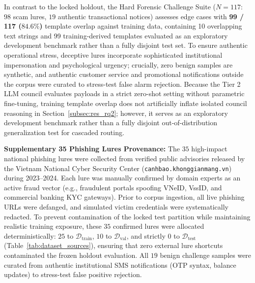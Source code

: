 In contrast to the locked holdout, the Hard Forensic Challenge Suite ($N=117$: $98$ scam lures, $19$ authentic transactional notices) assesses edge cases with \textbf{99 / 117 ($84.6\%$)} template overlap against training data, containing 10 overlapping text strings and 99 training-derived templates evaluated as an exploratory development benchmark rather than a fully disjoint test set. To ensure authentic operational stress, deceptive lures incorporate sophisticated institutional impersonation and psychological urgency; crucially, zero benign samples are synthetic, and authentic customer service and promotional notifications outside the corpus were curated to stress-test false alarm rejection. Because the Tier 2 LLM council evaluates payloads in a strict zero-shot setting without parametric fine-tuning, training template overlap does not artificially inflate isolated council reasoning in Section~\ref{subsec:res_rq2}; however, it serves as an exploratory development benchmark rather than a fully disjoint out-of-distribution generalization test for cascaded routing.

\textbf{Supplementary 35 Phishing Lures Provenance:} The $35$ high-impact national phishing lures were collected from verified public advisories released by the Vietnam National Cyber Security Center (\texttt{canhbao.khonggianmang.vn}) during 2023--2024. Each lure was manually confirmed by domain experts as an active fraud vector (e.g., fraudulent portals spoofing VNeID, VssID, and commercial banking KYC gateways). Prior to corpus ingestion, all live phishing URLs were defanged, and simulated victim credentials were systematically redacted. To prevent contamination of the locked test partition while maintaining realistic training exposure, these $35$ confirmed lures were allocated deterministically: $25$ to $\mathcal{D}_{\text{train}}$, $10$ to $\mathcal{D}_{\text{val}}$, and strictly $0$ to $\mathcal{D}_{\text{test}}$ (Table~\ref{tab:dataset_sources}), ensuring that zero external lure shortcuts contaminated the frozen holdout evaluation. All $19$ benign challenge samples were curated from authentic institutional SMS notifications (OTP syntax, balance updates) to stress-test false positive rejection.

